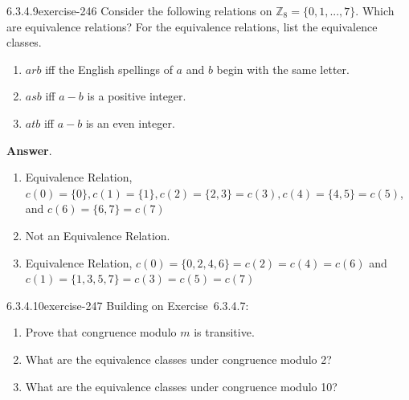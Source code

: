 \documentclass[twoside,10pt,]{book}
\numberwithin{equation}{section}
\begin{document}
\begin{divisionsolution}{6.3.4.9}{}{exercise-246}%
\hypertarget{p-2093}{}%
Consider the following relations on \(\mathbb{Z}_8= \{0, 1, . . . , 7\}\). Which are equivalence relations? For the equivalence relations, list the equivalence classes.%
\par
\hypertarget{p-2094}{}%
\leavevmode%
\begin{enumerate}[label=(\alph*)]
\item\hypertarget{li-1106}{}\hypertarget{p-2095}{}%
\(a r b\) iff the English spellings of \(a\) and \(b\) begin with the same letter.%
\item\hypertarget{li-1107}{}\hypertarget{p-2096}{}%
\(a s b\) iff \(a - b\) is a positive integer.%
\item\hypertarget{li-1108}{}\hypertarget{p-2097}{}%
\(a t b\) iff \(a-b\) is an even integer.%
\end{enumerate}
%
\par\smallskip%
\noindent\textbf{Answer}.\quad%
\hypertarget{p-2098}{}%
\leavevmode%
\begin{enumerate}[label=(\alph*)]
\item\hypertarget{li-1109}{}Equivalence Relation, \(c(0)=\{0\},c(1)=\{1\},c(2)=\{2,3\} =c(3),c(4)=\{4,5\}=c(5)\), and \(c(6)=\{6,7\}=c(7)\)%
\item\hypertarget{li-1110}{}\hypertarget{p-2099}{}%
Not an Equivalence Relation.%
\item\hypertarget{li-1111}{}\hypertarget{p-2100}{}%
Equivalence Relation, \(c(0)=\{0,2,4,6\}=c(2)=c(4)=c(6)\)  and \(c(1)=\{1,3,5,7\}=c(3)=c(5)=c(7)\)%
\end{enumerate}
%
\end{divisionsolution}%
\begin{divisionsolution}{6.3.4.10}{}{exercise-247}%
\hypertarget{p-2101}{}%
Building on Exercise~6.3.4.7:%
\par
\hypertarget{p-2102}{}%
\leavevmode%
\begin{enumerate}[label=(\alph*)]
\item\hypertarget{li-1112}{}\hypertarget{p-2103}{}%
Prove that congruence modulo \(m\) is transitive.%
\item\hypertarget{li-1113}{}\hypertarget{p-2104}{}%
What are the equivalence classes under congruence modulo 2?%
\item\hypertarget{li-1114}{}\hypertarget{p-2105}{}%
What are the equivalence classes under congruence modulo 10?%
\end{enumerate}
%
\end{divisionsolution}%
\end{document}
